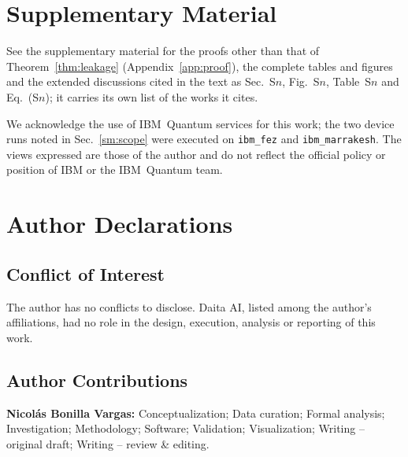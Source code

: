 \section*{Supplementary Material}
See the supplementary material for the proofs other than that of Theorem~\ref{thm:leakage}
(Appendix~\ref{app:proof}), the complete tables and figures and the extended discussions cited in the
text as Sec.~S$n$, Fig.~S$n$, Table~S$n$ and Eq.~(S$n$); it carries its own list of the works it cites.

\begin{acknowledgments}
We acknowledge the use of IBM~Quantum services for this work; the two device runs noted in
Sec.~\ref{sm:scope} were executed on \texttt{ibm\_fez} and \texttt{ibm\_marrakesh}. The views
expressed are those of the author and do not reflect the official policy or position of IBM or the
IBM~Quantum team.
\end{acknowledgments}

\section*{Author Declarations}
\subsection*{Conflict of Interest}
The author has no conflicts to disclose. Daita AI, listed among the author's affiliations, had no
role in the design, execution, analysis or reporting of this work.

\subsection*{Author Contributions}
\textbf{Nicol\'as Bonilla Vargas:} Conceptualization; Data curation; Formal analysis; Investigation;
Methodology; Software; Validation; Visualization; Writing -- original draft; Writing -- review \&
editing.

